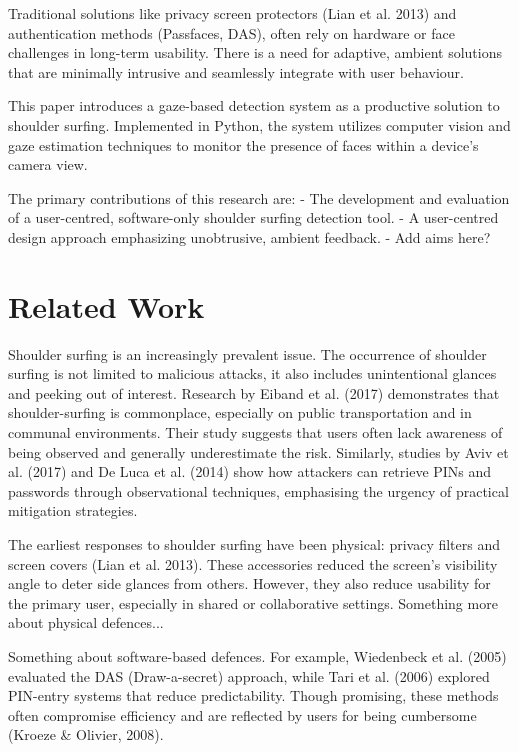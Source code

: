 \documentclass[12pt]{article}
\theoremstyle{plain}
\theoremstyle{definition}
\begin{document}
Traditional solutions like privacy screen protectors (Lian et al. 2013) and authentication methods (Passfaces, DAS), often rely on hardware or face challenges in long-term usability. There is a need for adaptive, ambient solutions that are minimally intrusive and seamlessly integrate with user behaviour.

This paper introduces a gaze-based detection system as a productive solution to shoulder surfing. Implemented in Python, the system utilizes computer vision and gaze estimation techniques to monitor the presence of faces within a device’s camera view.

The primary contributions of this research are:
-	The development and evaluation of a user-centred, software-only shoulder surfing detection tool.
-	A user-centred design approach emphasizing unobtrusive, ambient feedback.
-	Add aims here?


\section{Related Work}
\label{sec:Related Work} 

Shoulder surfing is an increasingly prevalent issue. The occurrence of shoulder surfing is not limited to malicious attacks, it also includes unintentional glances and peeking out of interest. Research by Eiband et al. (2017) demonstrates that shoulder-surfing is commonplace, especially on public transportation and in communal environments. Their study suggests that users often lack awareness of being observed and generally underestimate the risk. Similarly, studies by Aviv et al. (2017) and De Luca et al. (2014) show how attackers can retrieve PINs and passwords through observational techniques, emphasising the urgency of practical mitigation strategies.

The earliest responses to shoulder surfing have been physical: privacy filters and screen covers (Lian et al. 2013). These accessories reduced the screen’s visibility angle to deter side glances from others. However, they also reduce usability for the primary user, especially in shared or collaborative settings. Something more about physical defences... 

Something about software-based defences. For example, Wiedenbeck et al. (2005) evaluated the DAS (Draw-a-secret) approach, while Tari et al. (2006) explored PIN-entry systems that reduce predictability. Though promising, these methods often compromise efficiency and are reflected by users for being cumbersome (Kroeze & Olivier, 2008).
\end{document}

